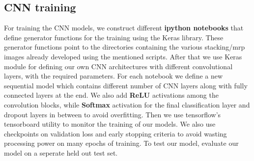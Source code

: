 \documentclass[letterpaper, 12 pt, conference]{ieeeconf}  %
\begin{document}
\subsection{CNN training}
For training the CNN models, we construct different \textbf{ipython notebooks} that define generator functions for the training using the Keras library. These generator functions point to the directories containing the various stacking/mrp images already developed using the mentioned scripts. After that we use Keras module for defining our own CNN architectures with different convolutional layers, with the required parameters. For each notebook we define a new sequential model which contains different number of CNN layers along with fully connected layers at the end. We also add \textbf{ReLU} activations among the convolution blocks, while \textbf{Softmax} activation for the final classification layer and dropout layers in between to avoid overfitting. Then we use tensorflow's tensorboard utility to monitor the training of our models. We also use checkpoints on validation loss and early stopping criteria to avoid wasting processing power on many epochs of training. To test our model, evaluate our model on a seperate held out test set.
\end{document}

